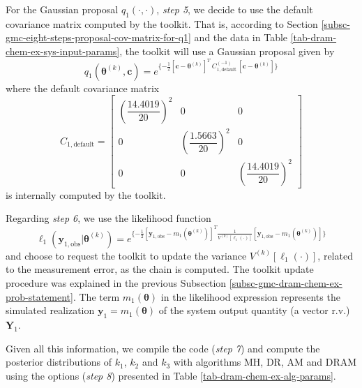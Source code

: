For the Gaussian proposal $q_1(\cdot,\cdot)$, {\it step 5},
we decide to use the default covariance matrix computed by the toolkit.
That is, according to Section \ref{subsc-gmc-eight-steps-proposal-cov-matrix-for-q1}
and the data in Table \ref{tab-dram-chem-ex-sys-input-params}, the toolkit will use a Gaussian proposal given by
\begin{equation*}
q_1(\boldsymbol{\theta}^{(k)},\mathbf{c}) = e^
{
\{
-\frac{1}{2}
[\mathbf{c}-\boldsymbol{\theta}^{(k)}]^T
~C_{1,\text{default}}^{(-1)}~
[\mathbf{c}-\boldsymbol{\theta}^{(k)}]
\}
}
\end{equation*}
where the default covariance matrix
\begin{equation*}
C_{1,\text{default}} =
\left[
\begin{array}{ccc}
\left(\dfrac{14.4019}{20}\right)^2 & 0                                 &                                  0 \\
                                 0 & \left(\dfrac{1.5663}{20}\right)^2 &                                  0 \\
                                 0 &                                 0 & \left(\dfrac{14.4019}{20}\right)^2
\end{array}
\right]
\end{equation*}
is internally computed by the toolkit.

Regarding {\it step 6},
we use the likelihood function
\begin{equation*}
\ell_1(\mathbf{y}_{1,\text{obs}}|\boldsymbol{\theta}^{(k)}) = e^
{
\{
-\frac{1}{2}
[\mathbf{y}_{1,\text{obs}}-m_1(\boldsymbol{\theta}^{(k)})]^T
\frac{1}{V^{(k)}[\ell_1(\cdot)]}
[\mathbf{y}_{1,\text{obs}}-m_1(\boldsymbol{\theta}^{(k)})]
\}
}
\end{equation*}
and choose to request the toolkit to update the variance $V^{(k)}[\ell_1(\cdot)]$, related to the measurement error, as the chain is computed.
The toolkit update procedure 
was explained in the previous Subsection \ref{subsc-gmc-dram-chem-ex-prob-statement}.
The term $m_1(\boldsymbol{\theta})$ in the likelihood expression represents the simulated realization $\mathbf{y}_1=m_1(\boldsymbol{\theta})$ of the system output quantity (a vector r.v.) $\mathbf{Y}_1$.

Given all this information,
we compile the code ({\it step 7}) and
compute the posterior distributions of $k_1$, $k_2$ and $k_3$ with algorithms MH, DR, AM and DRAM using the options ({\it step 8})
presented in Table \ref{tab-dram-chem-ex-alg-params}.

